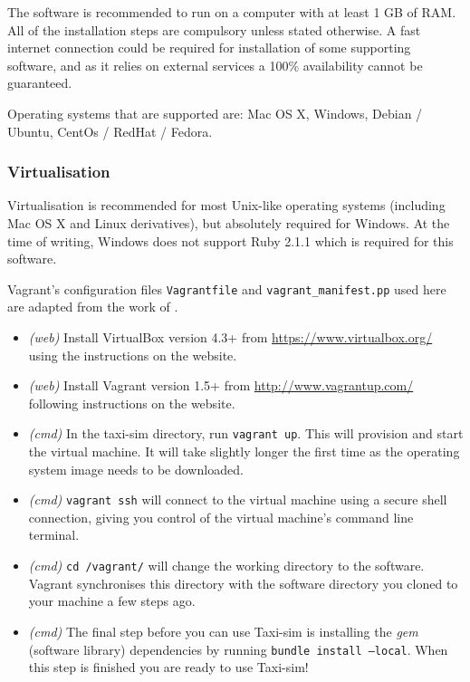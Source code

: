 The software is recommended to run on a computer with at least 1 GB of RAM. All
of the installation steps are compulsory unless stated otherwise. A fast
internet connection could be required for installation of some supporting
software, and as it relies on external services a 100\% availability cannot be
guaranteed.

Operating systems that are supported are: Mac OS X, Windows, Debian / Ubuntu,
CentOs / RedHat / Fedora.


\subsubsection{Virtualisation}
\label{sec:user_manual:installation:virtualisation}

Virtualisation is recommended for most Unix-like operating systems (including
Mac OS X and Linux derivatives), but absolutely required for Windows. At the
time of writing, Windows does not support Ruby 2.1.1 which is required for this
software.

Vagrant's configuration files \texttt{Vagrantfile} and
\texttt{vagrant\_manifest.pp} used here are adapted from the work of
\textcite{Rails+dev+box}.

\begin{itemize}
  \item \textit{(web)} Install VirtualBox version 4.3+ \parencite{Virtualbox}
        from \url{https://www.virtualbox.org/} using the instructions on the
        website.
  \item \textit{(web)} Install Vagrant version 1.5+ \parencite{Vagrant} from 
        \url{http://www.vagrantup.com/} following instructions on the website.
  \item \textit{(cmd)} In the taxi-sim directory, run \texttt{vagrant up}. This
        will provision and start the virtual machine. It will take slightly
        longer the first time as the operating system image needs to be
        downloaded.
  \item \textit{(cmd)} \texttt{vagrant ssh} will connect to the virtual machine 
        using a secure shell connection, giving you control of the virtual
        machine's command line terminal.
  \item \textit{(cmd)} \texttt{cd /vagrant/} will change the working
        directory to the software. Vagrant synchronises this directory with the
        software directory you cloned to your machine a few steps ago.
  \item \textit{(cmd)} The final step before you can use Taxi-sim is installing
        the \textit{gem} (software library) dependencies by running 
        \texttt{bundle install --local}. When this step is finished you are ready to use Taxi-sim!
\end{itemize}


